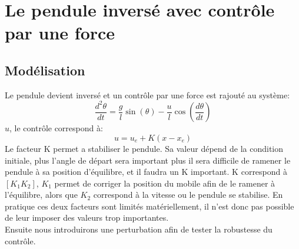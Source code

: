 \documentclass[11pt]{article}
\begin{document}
\section{Le pendule inversé avec contrôle par une force}
\subsection{Modélisation} 
Le pendule devient inversé et un contrôle par une force est rajouté au système:
\begin{equation}
	\frac{d^2\theta}{dt} = \frac{g}{l}\sin(\theta)-\frac{u}{l}\cos(\frac{d\theta}{dt})
\end{equation}
$u$, le contrôle correspond à:
\begin{equation}
	u=u_e+K(x-x_e)
\end{equation}
Le facteur K permet a stabiliser le pendule. Sa valeur dépend de la condition initiale, plus l'angle de départ sera important plus il sera difficile de ramener le pendule à sa position d'équilibre, et il faudra un K important. K correspond à $[K_1 K_2]$, $K_1$ permet de corriger la position du mobile afin de le ramener à l'équilibre, alors que $K_2$ correspond à la vitesse ou le pendule se stabilise. En pratique ces deux facteurs sont limités matériellement, il n'est donc pas possible de leur imposer des valeurs trop importantes. \\
Ensuite nous introduirons une perturbation afin de tester la robustesse du contrôle.
\end{document}

